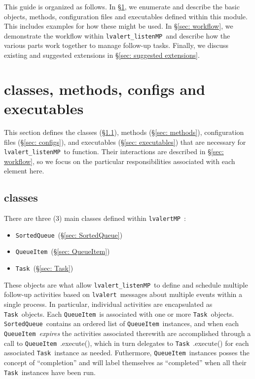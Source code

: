 \documentclass{article}
\newcommand{\alert}{\texttt{lvalert}~}
\newcommand{\lvalertMP}{\texttt{lvalertMP}~}
\newcommand{\lvalertListenMP}{\texttt{lvalert\_listenMP}~}
\newcommand{\SortedQueue}{\texttt{SortedQueue}~}
\newcommand{\QueueItem}{\texttt{QueueItem}~}
\newcommand{\Task}{\texttt{Task}~}
\begin{document}
This guide is organized as follows. In \S\ref{sec: classes, methods, configs and executables}, we enumerate and describe the basic objects, methods, configuration files and executables defined within this module. 
This includes examples for how these might be used.
In \S\ref{sec: workflow}, we demonstrate the workflow within \lvalertListenMP and describe how the various parts work together to manage follow-up tasks.
Finally, we discuss existing and suggested extensions in \S\ref{sec: suggested extensions}.


\section{classes, methods, configs and executables}
\label{sec: classes, methods, configs and executables}

This section defines the classes (\S\ref{sec: classes}), methods (\S\ref{sec: methods}), configuration files (\S\ref{sec: configs}), and executables (\S\ref{sec: executables}) that are necessary for \lvalertListenMP to function. 
Their interactions are described in \S\ref{sec: workflow}, so we focus on the particular responsibilities associated with each element here.


\subsection{classes}
\label{sec: classes}

There are three (3) main classes defined within \lvalertMP:
\begin{itemize}
    \item{\SortedQueue (\S\ref{sec: SortedQueue})}
    \item{\QueueItem (\S\ref{sec: QueueItem})}
    \item{\Task (\S\ref{sec: Task})}
\end{itemize}
These objects are what allow \lvalertListenMP to define and schedule multiple follow-up activities based on \alert messages about multiple events within a single process.
In particular, individual activities are encapsulated as \Task objects.
Each \QueueItem is associated with one or more \Task objects.
\SortedQueue contains an ordered list of \QueueItem instances, and when each \QueueItem \textit{expires} the activities associated therewith are accomplished through a call to \QueueItem.execute(), which in turn delegates to \Task.execute() for each associated \Task instance as needed.
Futhermore, \QueueItem instances posses the concept of ``completion'' and will label themselves as ``completed'' when all their \Task instances have been run.
\end{document}
